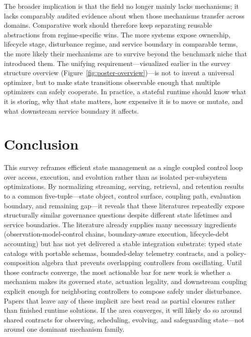\documentclass[acmsmall,screen,review]{acmart}
\begin{document}
The broader implication is that the field no longer mainly lacks mechanisms; it lacks comparably audited evidence about when those mechanisms transfer across domains. Comparative work should therefore keep separating reusable abstractions from regime-specific wins. The more systems expose ownership, lifecycle stage, disturbance regime, and service boundary in comparable terms, the more likely their mechanisms are to survive beyond the benchmark niche that introduced them. The unifying requirement---visualized earlier in the survey structure overview (Figure~\ref{fig:poster-overview})---is not to invent a universal optimizer, but to make state transitions observable enough that multiple optimizers can safely cooperate. In practice, a stateful runtime should know what it is storing, why that state matters, how expensive it is to move or mutate, and what downstream service boundary it affects.

\section{Conclusion}
\label{sec:conclusion}

This survey reframes efficient state management as a single coupled control loop over access, execution, and evolution rather than as isolated per-subsystem optimizations. By normalizing streaming, serving, retrieval, and retention results to a common five-tuple---state object, control surface, coupling path, evaluation boundary, and remaining gap---it reveals that these literatures repeatedly expose structurally similar governance questions despite different state lifetimes and service boundaries. The literature already supplies many necessary ingredients (observation-model-control chains, boundary-aware execution, lifecycle-debt accounting) but has not yet delivered a stable integration substrate: typed state catalogs with portable schemas, bounded-delay telemetry contracts, and a policy-composition algebra that prevents overlapping controllers from oscillating. Until those contracts converge, the most actionable bar for new work is whether a mechanism makes its governed state, actuation legality, and downstream coupling explicit enough for neighboring controllers to compose safely under disturbance. Papers that leave any of these implicit are best read as partial closures rather than finished runtime solutions. If the area converges, it will likely do so around shared contracts for observing, scheduling, evolving, and safeguarding state---not around one dominant mechanism family.



\end{document}
